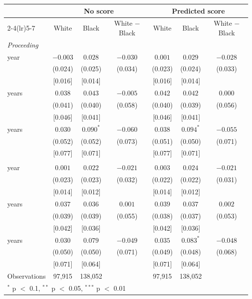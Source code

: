 \begin{tabular}{lcccccc}
\toprule
 & \multicolumn{3}{c}{No score} & \multicolumn{3}{c}{Predicted score} \\
\cmidrule(lr){2-4}\cmidrule(lr){5-7}
 & White & Black & White $-$ Black & White & Black & White $-$ Black \\
\midrule
\multicolumn{7}{l}{\textit{Proceeding}} \\
\quad 1 year & $-0.003$ & $0.028$ & $-0.030$ & $0.001$ & $0.029$ & $-0.028$ \\
 & (0.024) & (0.025) & (0.034) & (0.023) & (0.024) & (0.033) \\
 & [0.016] & [0.014] &  & [0.016] & [0.014] &  \\
\quad 2 years & $0.038$ & $0.043$ & $-0.005$ & $0.042$ & $0.042$ & $0.000$ \\
 & (0.041) & (0.040) & (0.058) & (0.040) & (0.039) & (0.056) \\
 & [0.046] & [0.041] &  & [0.046] & [0.041] &  \\
\quad 3 years & $0.030$ & $0.090^{*}$ & $-0.060$ & $0.038$ & $0.094^{*}$ & $-0.055$ \\
 & (0.052) & (0.052) & (0.073) & (0.051) & (0.050) & (0.071) \\
 & [0.077] & [0.071] &  & [0.077] & [0.071] &  \\
\addlinespace
\multicolumn{7}{l}{\textit{Revoked}} \\
\quad 1 year & $0.001$ & $0.022$ & $-0.021$ & $0.003$ & $0.024$ & $-0.021$ \\
 & (0.023) & (0.023) & (0.032) & (0.022) & (0.022) & (0.031) \\
 & [0.014] & [0.012] &  & [0.014] & [0.012] &  \\
\quad 2 years & $0.037$ & $0.036$ & $0.001$ & $0.039$ & $0.037$ & $0.002$ \\
 & (0.039) & (0.039) & (0.055) & (0.038) & (0.037) & (0.053) \\
 & [0.042] & [0.036] &  & [0.042] & [0.036] &  \\
\quad 3 years & $0.030$ & $0.079$ & $-0.049$ & $0.035$ & $0.083^{*}$ & $-0.048$ \\
 & (0.050) & (0.050) & (0.071) & (0.049) & (0.048) & (0.068) \\
 & [0.071] & [0.064] &  & [0.071] & [0.064] &  \\
\midrule
Observations & 97,915 & 138,052 &  & 97,915 & 138,052 &  \\
\bottomrule
\multicolumn{7}{l}{\footnotesize $^{*}$ p $<$ 0.1, $^{**}$ p $<$ 0.05, $^{***}$ p $<$ 0.01} \\
\end{tabular}
